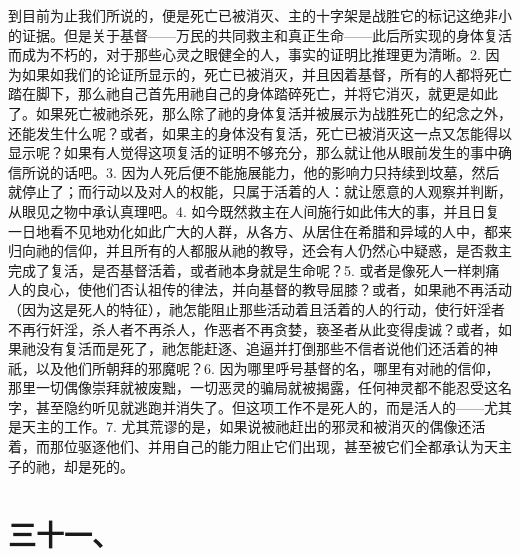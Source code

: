到目前为止我们所说的，便是死亡已被消灭、主的十字架是战胜它的标记这绝非小的证据。但是关于基督——万民的共同救主和真正生命——此后所实现的身体复活而成为不朽的，对于那些心灵之眼健全的人，事实的证明比推理更为清晰。2. 因为如果如我们的论证所显示的，死亡已被消灭，并且因着基督，所有的人都将死亡踏在脚下，那么祂自己首先用祂自己的身体踏碎死亡，并将它消灭，就更是如此了。如果死亡被祂杀死，那么除了祂的身体复活并被展示为战胜死亡的纪念之外，还能发生什么呢？或者，如果主的身体没有复活，死亡已被消灭这一点又怎能得以显示呢？如果有人觉得这项复活的证明不够充分，那么就让他从眼前发生的事中确信所说的话吧。3. 因为人死后便不能施展能力，他的影响力只持续到坟墓，然后就停止了；而行动以及对人的权能，只属于活着的人：就让愿意的人观察并判断，从眼见之物中承认真理吧。4. 如今既然救主在人间施行如此伟大的事，并且日复一日地看不见地劝化如此广大的人群，从各方、从居住在希腊和异域的人中，都来归向祂的信仰，并且所有的人都服从祂的教导，还会有人仍然心中疑惑，是否救主完成了复活，是否基督活着，或者祂本身就是生命呢？5. 或者是像死人一样刺痛人的良心，使他们否认祖传的律法，并向基督的教导屈膝？或者，如果祂不再活动（因为这是死人的特征），祂怎能阻止那些活动着且活着的人的行动，使行奸淫者不再行奸淫，杀人者不再杀人，作恶者不再贪婪，亵圣者从此变得虔诚？或者，如果祂没有复活而是死了，祂怎能赶逐、追逼并打倒那些不信者说他们还活着的神祇，以及他们所朝拜的邪魔呢？6. 因为哪里呼号基督的名，哪里有对祂的信仰，那里一切偶像崇拜就被废黜，一切恶灵的骗局就被揭露，任何神灵都不能忍受这名字，甚至隐约听见就逃跑并消失了。但这项工作不是死人的，而是活人的——尤其是天主的工作。7. 尤其荒谬的是，如果说被祂赶出的邪灵和被消灭的偶像还活着，而那位驱逐他们、并用自己的能力阻止它们出现，甚至被它们全都承认为天主子的祂，却是死的。\par


\section{三十一、}


